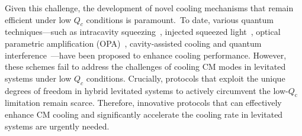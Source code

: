 \documentclass[aps, prresearch, reprint, nofootinbib, longbibliography]{revtex4-2}
\begin{document}
Given this challenge, the development of novel cooling mechanisms that remain efficient under low $Q_c$ conditions is paramount.~To date, various quantum techniques---such as intracavity squeezing~\cite{PhysRevLett.124.103602, Gan2019}, injected squeezed light~\cite{Asjad2019,PhysRevA.94.051801,Nat2017,Aasi2013}, optical parametric amplification (OPA)~\cite{qipOPA2023}, cavity-assisted cooling and quantum interference~\cite{PhysRevA.87.025804}---have been proposed to enhance cooling performance. However, these schemes fail to address the challenges of cooling CM modes in levitated systems under low $Q_c$ conditions.
Crucially, protocols that exploit the unique degrees of freedom in hybrid levitated systems to actively circumvent the low-$Q_\text{c}$ limitation remain scarce.
Therefore, innovative protocols that can effectively enhance CM cooling and significantly accelerate the cooling rate in levitated systems are urgently needed.

\end{document}
